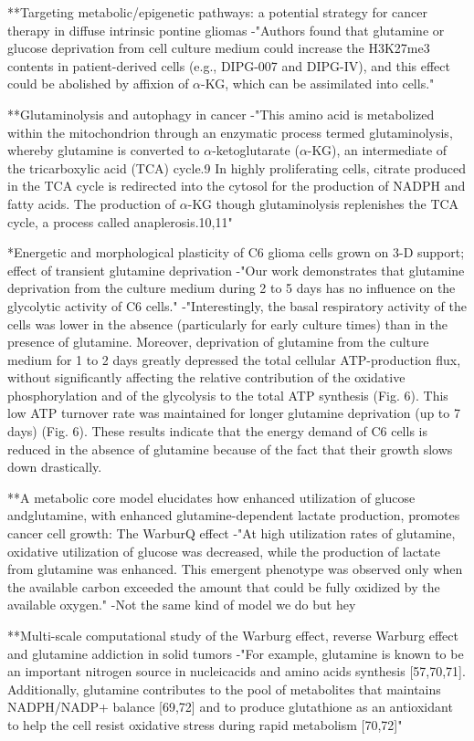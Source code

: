 \documentclass[11pt,a4paper]{article}
\begin{document}
**Targeting metabolic/epigenetic pathways: a potential strategy for cancer therapy in diffuse intrinsic pontine gliomas
-"Authors found that glutamine or glucose deprivation from cell culture medium could increase the H3K27me3 contents in patient-derived cells (e.g., DIPG-007 and DIPG-IV), and this effect could be abolished by affixion of $\alpha$-KG, which can be assimilated into cells."

**Glutaminolysis and autophagy in cancer
-"This amino acid is metabolized within the mitochondrion through an enzymatic process termed glutaminolysis, whereby glutamine is converted to $\alpha$-ketoglutarate ($\alpha$-KG), an intermediate of the tricarboxylic acid (TCA) cycle.9 In highly proliferating cells, citrate produced in the TCA cycle is redirected into the cytosol for the production of NADPH and fatty acids. The production of $\alpha$-KG though glutaminolysis replenishes the TCA cycle, a process called anaplerosis.10,11"


*Energetic and morphological plasticity of C6 glioma cells grown on 3-D support; effect of transient glutamine deprivation 
-"Our work demonstrates that glutamine deprivation from the culture medium during 2 to 5 days has no influence on the glycolytic activity of C6 cells."
-"Interestingly, the basal respiratory activity of the cells was lower in the absence (particularly for early culture times) than in the presence of glutamine. Moreover, deprivation of glutamine from the culture medium for 1 to 2 days greatly depressed the total cellular ATP-production flux, without significantly affecting the relative contribution of the oxidative phosphorylation and of the glycolysis to the total ATP synthesis (Fig. 6). This low ATP turnover rate was maintained for longer glutamine deprivation (up to 7 days) (Fig. 6). These results indicate that the energy demand of C6 cells is reduced in the absence of glutamine because of the fact that their growth slows down drastically.

**A metabolic core model elucidates how enhanced utilization of glucose andglutamine, with enhanced glutamine-dependent lactate production, promotes cancer cell growth: The WarburQ effect
-"At high utilization rates of glutamine, oxidative utilization of glucose was decreased, while the production
of lactate from glutamine was enhanced. This emergent phenotype was observed only
when the available carbon exceeded the amount that could be fully oxidized by the available
oxygen."
-Not the same kind of model we do but hey

**Multi-scale computational study of the Warburg effect, reverse Warburg effect and glutamine addiction in solid tumors
-"For example, glutamine is known to be an important nitrogen source in nucleicacids and amino acids synthesis [57,70,71]. Additionally, glutamine contributes to the pool of metabolites that maintains NADPH/NADP+ balance [69,72] and to produce glutathione as an antioxidant to help the cell resist oxidative stress during rapid metabolism [70,72]"
\end{document}
